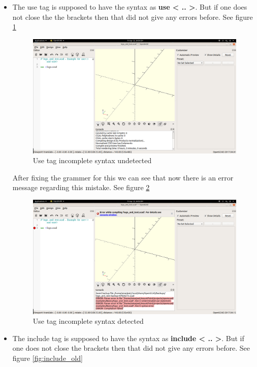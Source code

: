 \begin{itemize}
	\item The use tag is supposed to have the syntax as \textbf{use < .. >}. But if one does not close the the brackets then that did not give any errors before. See figure \ref{fig:use_old}
	\begin{figure}
		\centering
		\includegraphics[width=\linewidth]{images/output/grammer_use_old.png}
		\caption{Use tag incomplete syntax undetected}
		\label{fig:use_old}
	\end{figure}
	After fixing the grammer for this we can see that now there is an error message regarding this mistake. See figure \ref{fig:use_new}
	\begin{figure}
		\centering
		\includegraphics[width=\linewidth]{images/output/grammer_use_new.png}
		\caption{Use tag incomplete syntax detected}
		\label{fig:use_new}
	\end{figure}
	\item The include tag is supposed to have the syntax as \textbf{include < .. >}. But if one does not close the brackets then that did not give any errors before. See figure \ref{fig:include_old}

\end{itemize}
